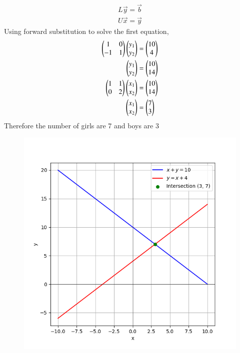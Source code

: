 \documentclass[journal]{IEEEtran}
\numberwithin{equation}{enumi}
\numberwithin{figure}{enumi}
\begin{document}
\begin{align}
    L\vec{y} = \vec{b}\\
    U\vec{x} = \vec{y}
\end{align}
Using forward substitution to solve the first equation,
\begin{align}
    \begin{pmatrix}1&0\\-1&1\end{pmatrix}\begin{pmatrix}y_1\\y_2\end{pmatrix}&=\begin{pmatrix}10\\4\end{pmatrix}\\
    \begin{pmatrix}y_1\\y_2\end{pmatrix}&=\begin{pmatrix}10\\14\end{pmatrix}\\
    \begin{pmatrix}1&1\\0&2\end{pmatrix}\begin{pmatrix}x_1\\x_2\end{pmatrix}&=\begin{pmatrix}10\\14\end{pmatrix}\\
    \begin{pmatrix}x_1\\x_2\end{pmatrix}&=\begin{pmatrix}7\\3\end{pmatrix}
\end{align}
Therefore the number of girls are 7 and boys are 3\\
\begin{figure}[h!]
	\centering
	\includegraphics[width=\columnwidth]{figs/Figure_1.png}
	\label{stemplot}
\end{figure}
\end{document}
